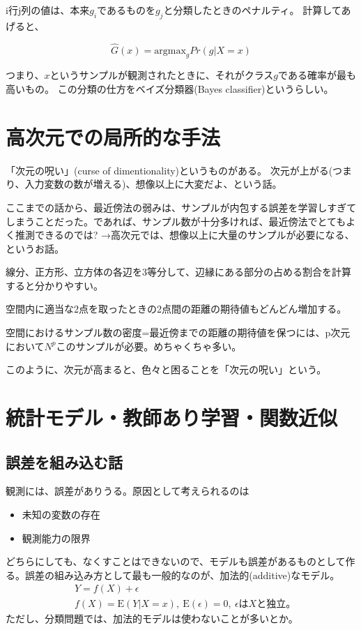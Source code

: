 \documentclass{jsarticle}
\begin{document}
i行j列の値は、本来$g_i$であるものを$g_j$と分類したときのペナルティ。
計算してあげると、

\[
  \hat{G}(x) = \mathrm{argmax}_g Pr(g|X=x)
\]

つまり、$x$というサンプルが観測されたときに、それがクラス$g$である確率が最も高いもの。
この分類の仕方をベイズ分類器(Bayes classifier)というらしい。

\section{高次元での局所的な手法}
「次元の呪い」(curse of dimentionality)というものがある。
次元が上がる(つまり、入力変数の数が増える)、想像以上に大変だよ、という話。

ここまでの話から、最近傍法の弱みは、サンプルが内包する誤差を学習しすぎてしまうことだった。であれば、サンプル数が十分多ければ、最近傍法でとてもよく推測できるのでは?
→高次元では、想像以上に大量のサンプルが必要になる、というお話。

線分、正方形、立方体の各辺を3等分して、辺縁にある部分の占める割合を計算すると分かりやすい。

空間内に適当な2点を取ったときの2点間の距離の期待値もどんどん増加する。

空間におけるサンプル数の密度=最近傍までの距離の期待値を保つには、p次元において$N^p$このサンプルが必要。めちゃくちゃ多い。

このように、次元が高まると、色々と困ることを「次元の呪い」という。

\section{統計モデル・教師あり学習・関数近似}
\subsection{誤差を組み込む話}
観測には、誤差がありうる。原因として考えられるのは
\begin{itemize}
  \item 未知の変数の存在
  \item 観測能力の限界
\end{itemize}
どちらにしても、なくすことはできないので、モデルも誤差があるものとして作る。誤差の組み込み方として最も一般的なのが、加法的(additive)なモデル。
\begin{eqnarray*}
  &Y=f(X)+\epsilon \\
  &f(X)=\mathrm{E}(Y|X=x), \ \mathrm{E}(\epsilon)=0, \ \epsilon \mbox{は} X \mbox{と独立。}
\end{eqnarray*}
ただし、分類問題では、加法的モデルは使わないことが多いとか。
\end{document}
